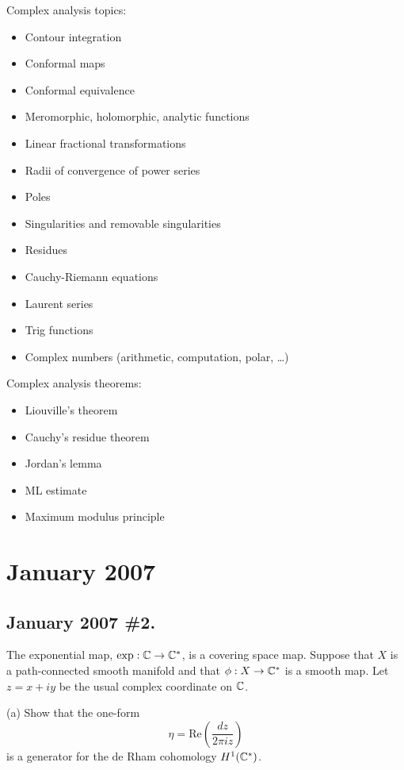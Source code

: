 \documentclass[10pt]{article}
\numberwithin{equation}{subsection}
\begin{document}
Complex analysis topics:
\begin{itemize}
\item Contour integration
\item Conformal maps 
\item Conformal equivalence
\item Meromorphic, holomorphic, analytic functions
\item Linear fractional transformations
\item Radii of convergence of power series
\item Poles
\item Singularities and removable singularities
\item Residues
\item Cauchy-Riemann equations
\item Laurent series
\item Trig functions
\item Complex numbers (arithmetic, computation, polar, \ldots)
\end{itemize}

Complex analysis theorems:
\begin{itemize}
\item Liouville's theorem
\item Cauchy's residue theorem
\item Jordan's lemma
\item ML estimate
\item Maximum modulus principle
\end{itemize}

\section{January 2007}

\subsection{January 2007 \#2.}
\label{sec:J07.2}

The exponential map, $\exp:\mathbb{C}\to\mathbb{C}^*$, is a covering space map. Suppose that
$X$ is a path-connected smooth manifold and that $\phi:X \to\mathbb{C}^*$ is a smooth
map.  Let $z=x+iy$ be the usual complex coordinate on $\mathbb{C}$.

(a) Show that the one-form
$$
	\eta = \mathrm{Re}\left(\frac{dz}{2\pi iz}\right)
$$
is a generator for the de Rham cohomology $H^1(\mathbb{C}^*)$.
\end{document}
